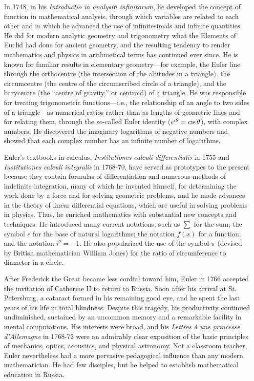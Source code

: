 In 1748, in his \textit{Introductio in analysin infinitorum}, he developed the concept of function in mathematical analysis, through which variables are related to each other and in which he advanced the use of infinitesimals and infinite quantities. He did for modern analytic geometry and trigonometry what the Elements of Euclid had done for ancient geometry, and the resulting tendency to render mathematics and physics in arithmetical terms has continued ever since. He is known for familiar results in elementary geometry—for example, the Euler line through the orthocentre (the intersection of the altitudes in a triangle), the circumcentre (the centre of the circumscribed circle of a triangle), and the barycentre (the “centre of gravity,” or centroid) of a triangle. He was responsible for treating trigonometric functions—i.e., the relationship of an angle to two sides of a triangle—as numerical ratios rather than as lengths of geometric lines and for relating them, through the so-called Euler identity ($ e^{i \theta} = \mathrm{cis}\thinspace\theta $), with complex numbers. He discovered the imaginary logarithms of negative numbers and showed that each complex number has an infinite number of logarithms.

Euler’s textbooks in calculus, \textit{Institutiones calculi differentialis} in 1755 and \textit{Institutiones calculi integralis} in 1768-70, have served as prototypes to the present because they contain formulas of differentiation and numerous methods of indefinite integration, many of which he invented himself, for determining the work done by a force and for solving geometric problems, and he made advances in the theory of linear differential equations, which are useful in solving problems in physics. Thus, he enriched mathematics with substantial new concepts and techniques. He introduced many current notations, such as $\sum$ for the sum; the symbol $e$ for the base of natural logarithms; the notation $ f(x) $ for a function; and the notation $i^2 = -1 $. He also popularized the use of the symbol $\pi$ (devised by British mathematician William Jones) for the ratio of circumference to diameter in a circle.

After Frederick the Great became less cordial toward him, Euler in 1766 accepted the invitation of Catherine II to return to Russia. Soon after his arrival at St. Petersburg, a cataract formed in his remaining good eye, and he spent the last years of his life in total blindness. Despite this tragedy, his productivity continued undiminished, sustained by an uncommon memory and a remarkable facility in mental computations. His interests were broad, and his \textit{Lettres \`a une princesse d’Allemagne} in 1768-72 were an admirably clear exposition of the basic principles of mechanics, optics, acoustics, and physical astronomy. Not a classroom teacher, Euler nevertheless had a more pervasive pedagogical influence than any modern mathematician. He had few disciples, but he helped to establish mathematical education in Russia.

